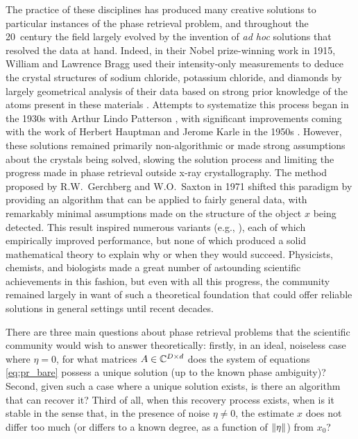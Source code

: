   The practice of these disciplines has produced many creative solutions to particular instances of the phase retrieval problem, and throughout the 20\th\ century the field largely evolved by the invention of \emph{ad hoc} solutions that resolved the data at hand.  Indeed, in their Nobel prize-winning work in 1915, William and Lawrence Bragg used their intensity-only measurements to deduce the crystal structures of sodium chloride, potassium chloride, and diamonds by largely geometrical analysis of their data based on strong prior knowledge of the atoms present in these materials \cite[pp.~88-92, 102-105]{bragg1915crystal_structure}.  Attempts to systematize this process began in the 1930s with Arthur Lindo Patterson \cite{patterson1934fourier_method}, with significant improvements coming with the work of Herbert Hauptman and Jerome Karle in the 1950s \cite{hauptman1953monograph}.  However, these solutions remained primarily non-algorithmic or made strong assumptions about the crystals being solved, slowing the solution process and limiting the progress made in phase retrieval outside x-ray crystallography.  The method proposed by R.W.~Gerchberg and W.O.~Saxton in 1971 \cite{gerchberg1972practical} shifted this paradigm by providing an algorithm that can be applied to fairly general data, with remarkably minimal assumptions made on the structure of the object $x$ being detected.  This result inspired numerous variants (e.g., \cite{bauschke2003hybrid,bauschke2002phase,elser2003phase,fienup1978reconstruction,takajo1997numerical,takajo1998study,takajo1999further}), each of which empirically improved performance, but none of which produced a solid mathematical theory to explain why or when they would succeed.  Physicists, chemists, and biologists made a great number of astounding scientific achievements in this fashion, but even with all this progress, the community remained largely in want of such a theoretical foundation that could offer reliable solutions in general settings until recent decades.
  
  There are three main questions about phase retrieval problems that the scientific community would wish to answer theoretically: firstly, in an ideal, noiseless case where $\eta = 0$, for what matrices $A \in \mathbb{C}^{D \times d}$ does the system of equations \eqref{eq:pr_bare} possess a unique solution (up to the known phase ambiguity)?  Second, given such a case where a unique solution exists, is there an algorithm that can recover it?  Third of all, when this recovery process exists, when is it stable in the sense that, in the presence of noise $\eta \neq 0$, the estimate $x$ does not differ too much (or differs to a known degree, as a function of $\lVert\eta\rVert$) from $x_0$?

